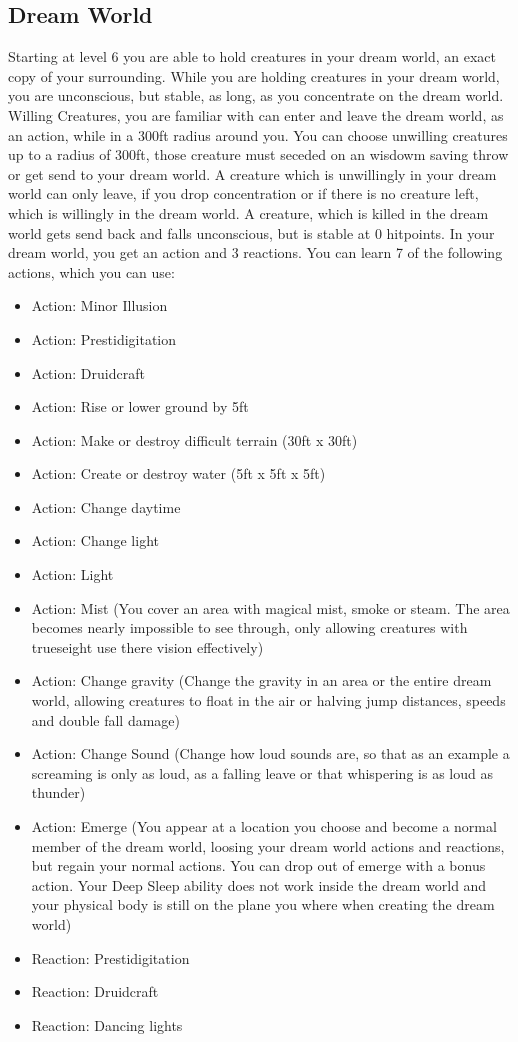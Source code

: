 \documentclass[a4paper,10pt,twoside,twocolumn]{dndbook} %
\begin{document}
	\subsection{Dream World}
	Starting at level 6 you are able to hold creatures in your dream world, an exact copy of your surrounding. While you are holding creatures in your dream world, you are unconscious, but stable, as long, as you concentrate on the dream world. Willing Creatures, you are familiar with can enter and leave the dream world, as an action, while in a 300ft radius around you. You can choose unwilling creatures up to a radius of 300ft, those creature must seceded on an wisdowm saving throw or get send to your dream world. A creature which is unwillingly in your dream world can only leave, if you drop concentration or if there is no creature left, which is willingly in the dream world. A creature, which is killed in the dream world gets send back and falls unconscious, but is stable at 0 hitpoints. In your dream world, you get an action and 3 reactions. You can learn 7 of the following actions, which you can use: %
	\begin{itemize}
		\item Action: Minor Illusion
		\item Action: Prestidigitation
		\item Action: Druidcraft
		\item Action: Rise or lower ground by 5ft
		\item Action: Make or destroy difficult terrain (30ft x 30ft)
		\item Action: Create or destroy water (5ft x 5ft x 5ft)
		\item Action: Change daytime
		\item Action: Change light
		\item Action: Light
		\item Action: Mist (You cover an area with magical mist, smoke or steam. The area becomes nearly impossible to see through, only allowing creatures with trueseight use there vision effectively)
		\item Action: Change gravity (Change the gravity in an area or the entire dream world, allowing creatures to float in the air or halving jump distances, speeds and double fall damage)
		\item Action: Change Sound (Change how loud sounds are, so that as an example a screaming is only as loud, as a falling leave or that whispering is as loud as thunder)
		\item Action: Emerge (You appear at a location you choose and become a normal member of the dream world, loosing your dream world actions and reactions, but regain your normal actions. You can drop out of emerge with a bonus action. Your Deep Sleep ability does not work inside the dream world and your physical body is still on the plane you where when creating the dream world)
		\item Reaction: Prestidigitation
		\item Reaction: Druidcraft
		\item Reaction: Dancing lights
	\end{itemize}
\end{document}
